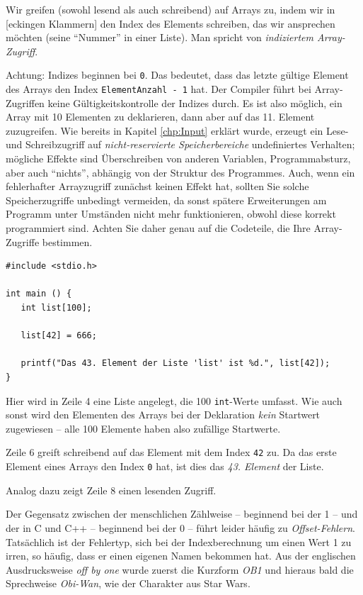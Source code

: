 Wir greifen (sowohl lesend als auch schreibend) auf Arrays zu, indem wir in [eckingen Klammern] den Index des Elements schreiben, das wir ansprechen möchten (\ie seine \enquote{Nummer} in einer Liste). Man spricht von \emph{indiziertem Array-Zugriff}.

\begin{warnbox}[Indizierung ab 0]
Achtung: Indizes beginnen bei \texttt{0}. Das bedeutet, dass das letzte gültige Element des Arrays den Index \texttt{ElementAnzahl - 1} hat. Der Compiler führt bei Array-Zugriffen keine Gültigkeitskontrolle der Indizes durch. Es ist also möglich, ein Array mit 10 Elementen zu deklarieren, dann aber auf das 11. Element zuzugreifen. Wie bereits in Kapitel \ref{chp:Input} erklärt wurde, erzeugt ein Lese- und Schreibzugriff auf \emph{nicht-reservierte Speicherbereiche} undefiniertes Verhalten; mögliche Effekte sind Überschreiben von anderen Variablen, Programmabsturz, aber auch \enquote{nichts}, abhängig von der Struktur des Programmes. Auch, wenn ein fehlerhafter Arrayzugriff zunächst keinen Effekt hat, sollten Sie solche Speicherzugriffe unbedingt vermeiden, da sonst spätere Erweiterungen am Programm unter Umständen nicht mehr funktionieren, obwohl diese korrekt programmiert sind. Achten Sie daher genau auf die Codeteile, die Ihre Array-Zugriffe bestimmen.
\end{warnbox}

\begin{codebox}
\begin{verbatim}
#include <stdio.h>

int main () {
   int list[100];

   list[42] = 666;

   printf("Das 43. Element der Liste 'list' ist %d.", list[42]);
}
\end{verbatim}
\end{codebox}

Hier wird in Zeile 4 eine Liste angelegt, die 100 \texttt{int}-Werte umfasst. Wie auch sonst wird den Elementen des Arrays bei der Deklaration \emph{kein} Startwert zugewiesen -- alle 100 Elemente haben also zufällige Startwerte.

Zeile 6 greift schreibend auf das Element mit dem Index \texttt{42} zu. Da das erste Element eines Arrays den Index \texttt{0} hat, ist dies das \emph{43. Element} der Liste.

Analog dazu zeigt Zeile 8 einen lesenden Zugriff.

\begin{hintbox}
Der Gegensatz zwischen der menschlichen Zählweise -- beginnend bei der 1 -- und der in C und C++ -- beginnend bei der 0 -- führt leider häufig zu \emph{Offset-Fehlern}. Tatsächlich ist der Fehlertyp, sich bei der Indexberechnung um einen Wert 1 zu irren, so häufig, dass er einen eigenen Namen bekommen hat. Aus der englischen Ausdrucksweise \emph{off by one} wurde zuerst die Kurzform \emph{OB1} und hieraus bald die Sprechweise \emph{Obi-Wan}, wie der Charakter aus Star Wars.
\end{hintbox}

